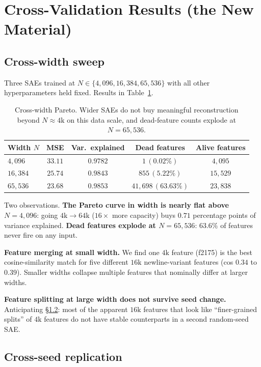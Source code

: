 \documentclass[11pt]{article}
\begin{document}
\section{Cross-Validation Results (the New Material)}

\subsection{Cross-width sweep}
\label{sec:width}

Three SAEs trained at $N \in \{4{,}096, 16{,}384, 65{,}536\}$ with all
other hyperparameters held fixed. Results in
Table~\ref{tab:pareto}.

\begin{table}[h]
\centering
\caption{Cross-width Pareto. Wider SAEs do not buy meaningful
reconstruction beyond $N \approx 4\text{k}$ on this data scale, and
dead-feature counts explode at $N=65{,}536$.}
\label{tab:pareto}
\begin{tabular}{lcccc}
\toprule
Width $N$ & MSE & Var.\ explained & Dead features & Alive features \\
\midrule
$4{,}096$  & $33.11$ & $0.9782$ & $1 \,(0.02\%)$  & $4{,}095$ \\
$16{,}384$ & $25.74$ & $0.9843$ & $855 \,(5.22\%)$ & $15{,}529$ \\
$65{,}536$ & $23.68$ & $0.9853$ & $41{,}698 \,(63.63\%)$ & $23{,}838$ \\
\bottomrule
\end{tabular}
\end{table}

Two observations. \textbf{The Pareto curve in width is nearly flat above}
$N = 4{,}096$: going $4\text{k} \to 64\text{k}$ ($16\times$ more
capacity) buys $0.71$ percentage points of variance explained.
\textbf{Dead features explode at $N = 65{,}536$}: $63.6\%$ of features
never fire on any input.

\textbf{Feature merging at small width.} We find one $4\text{k}$ feature
(f2175) is the best cosine-similarity match for five different $16\text{k}$
newline-variant features (cos $0.34$ to $0.39$). Smaller widths collapse
multiple features that nominally differ at larger widths.

\textbf{Feature splitting at large width does not survive seed change.}
Anticipating \S\ref{sec:seed}: most of the apparent $16\text{k}$ features
that look like ``finer-grained splits'' of $4\text{k}$ features do not
have stable counterparts in a second random-seed SAE.

\subsection{Cross-seed replication}
\label{sec:seed}
\end{document}
